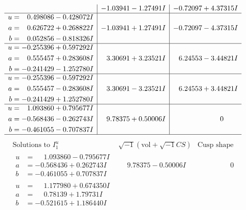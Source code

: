 \documentclass[1p]{elsarticle_modified}
\theoremstyle{definition}
\newcommand{\I}{\sqrt{-1}}
\begin{document}
$$\begin{array}{c|c|c}
 & -1.03941 - 1.27491 I & -0.72097 + 4.37315 I \\ \hline\begin{aligned}
u &= \phantom{-}0.498086 - 0.428072 I \\
a &= \phantom{-}0.626722 + 0.268822 I \\
b &= \phantom{-}0.052856 - 0.818326 I\end{aligned}
 & -1.03941 + 1.27491 I & -0.72097 - 4.37315 I \\ \hline\begin{aligned}
u &= -0.255396 + 0.597292 I \\
a &= \phantom{-}0.555457 + 0.283608 I \\
b &= -0.241429 - 1.252780 I\end{aligned}
 & \phantom{-}3.30691 + 3.23521 I & \phantom{-}6.24553 - 3.44821 I \\ \hline\begin{aligned}
u &= -0.255396 - 0.597292 I \\
a &= \phantom{-}0.555457 - 0.283608 I \\
b &= -0.241429 + 1.252780 I\end{aligned}
 & \phantom{-}3.30691 - 3.23521 I & \phantom{-}6.24553 + 3.44821 I \\ \hline\begin{aligned}
u &= \phantom{-}1.093860 + 0.795677 I \\
a &= -0.568436 - 0.262743 I \\
b &= -0.461055 - 0.707837 I\end{aligned}
 & \phantom{-}9.78375 + 0.50006 I & \phantom{-0.000000 } 0\\
 \hline 
 \end{array}$$\newpage$$\begin{array}{c|c|c}  
\text{Solutions to }I^u_{1}& \I (\text{vol} + \sqrt{-1}CS) & \text{Cusp shape}\\
 \hline 
\begin{aligned}
u &= \phantom{-}1.093860 - 0.795677 I \\
a &= -0.568436 + 0.262743 I \\
b &= -0.461055 + 0.707837 I\end{aligned}
 & \phantom{-}9.78375 - 0.50006 I & \phantom{-0.000000 } 0 \\ \hline\begin{aligned}
u &= \phantom{-}1.177980 + 0.674350 I \\
a &= \phantom{-}0.78139 + 1.79731 I \\
b &= -0.521615 + 1.186440 I\end{aligned}

\end{array}$$
\end{document}
